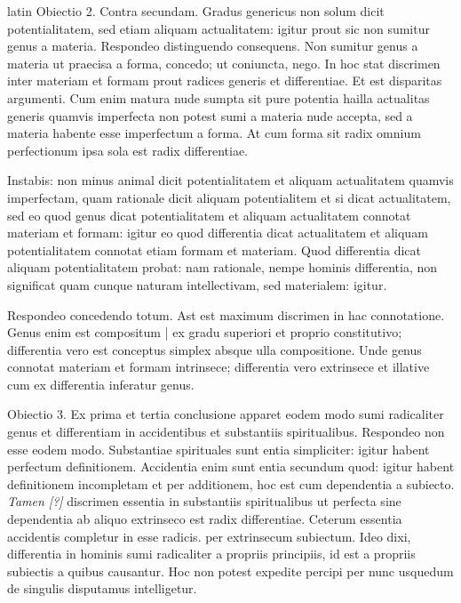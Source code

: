 \begin{otherlanguage*}{latin}
\pstart
 Obiectio 2. Contra secundam. Gradus genericus non solum dicit potentialitatem, sed etiam aliquam actualitatem: igitur prout sic non sumitur genus a materia. Respondeo distinguendo consequens. Non sumitur genus a materia ut praecisa a forma, concedo; ut coniuncta, nego. In hoc stat discrimen inter materiam et formam prout radices generis et differentiae. Et est disparitas argumenti. Cum enim matura nude sumpta sit pure potentia hailla actualitas generis quamvis imperfecta non potest sumi a materia nude accepta, sed a materia habente esse imperfectum a forma. At cum forma sit radix omnium perfectionum ipsa sola est radix differentiae. 
\pend

\pstart
 Instabis: non minus animal dicit potentialitatem et aliquam actualitatem quamvis imperfectam, quam rationale dicit aliquam potentialitem et si dicat actualitatem, sed eo quod genus dicat potentialitatem et aliquam actualitatem connotat materiam et formam: igitur eo quod differentia dicat actualitatem et aliquam potentialitatem connotat etiam formam et materiam. Quod differentia dicat aliquam potentialitatem probat: nam rationale, nempe hominis differentia, non significat quam cunque naturam intellectivam, sed materialem: igitur. 
\pend

\pstart
 Respondeo concedendo totum. Ast est maximum discrimen in hac connotatione. Genus enim est compositum \textnormal{|}    ex gradu superiori et proprio constitutivo; differentia vero est conceptus simplex absque ulla compositione. Unde genus connotat materiam et formam intrinsece; differentia vero extrinsece et illative cum ex differentia inferatur genus. 
\pend

\pstart
 Obiectio 3. Ex prima et tertia conclusione apparet eodem modo sumi radicaliter genus et differentiam in accidentibus et substantiis spiritualibus. Respondeo non esse eodem modo. Substantiae spirituales sunt entia simpliciter: igitur habent perfectum definitionem. Accidentia enim sunt entia secundum quod: igitur habent definitionem incompletam et per additionem, hoc est cum dependentia a subiecto. \emph{Tamen [?]} discrimen essentia in substantiis spiritualibus ut perfecta sine dependentia ab aliquo extrinseco est radix differentiae. Ceterum essentia accidentis completur in esse radicis. per extrinsecum subiectum. Ideo dixi, differentia in hominis sumi radicaliter a propriis principiis, id est a propriis subiectis a quibus causantur. Hoc non potest expedite percipi per nunc usquedum de singulis disputamus intelligetur. 
\pend


\end{otherlanguage*}
